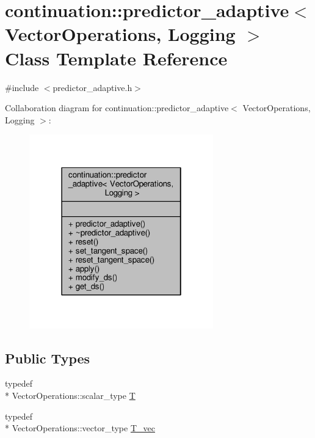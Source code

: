 \hypertarget{classcontinuation_1_1predictor__adaptive}{\section{continuation\-:\-:predictor\-\_\-adaptive$<$ Vector\-Operations, Logging $>$ Class Template Reference}
\label{classcontinuation_1_1predictor__adaptive}
}


{\ttfamily \#include $<$predictor\-\_\-adaptive.\-h$>$}



Collaboration diagram for continuation\-:\-:predictor\-\_\-adaptive$<$ Vector\-Operations, Logging $>$\-:\nopagebreak
\begin{figure}[H]
\begin{center}
\leavevmode
\includegraphics[width=226pt]{classcontinuation_1_1predictor__adaptive__coll__graph}
\end{center}
\end{figure}
\subsection*{Public Types}
\begin{DoxyCompactItemize}
\item 
typedef \\*
Vector\-Operations\-::scalar\-\_\-type \hyperlink{classcontinuation_1_1predictor__adaptive_add46ad992055f6fad831be827ae49ddb}{T}
\item 
typedef \\*
Vector\-Operations\-::vector\-\_\-type \hyperlink{classcontinuation_1_1predictor__adaptive_ae84bcc7dd9cf2c85cd18bbb0de1c42b2}{T\-\_\-vec}
\end{DoxyCompactItemize}
